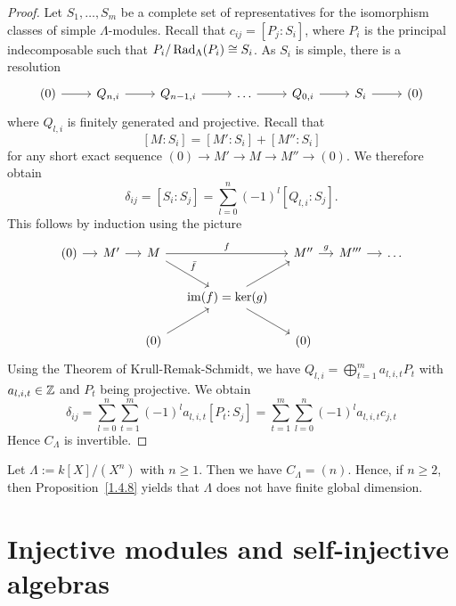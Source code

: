 \begin{proof}
Let $S_1,\dots,S_m$ be a complete set of representatives for the isomorphism classes of simple $\Lambda$-modules. Recall that $c_{ij}=[P_j:S_i]$, where $P_i$ is the principal indecomposable such that $P_i/\operatorname{Rad}_\Lambda(P_i)\cong S_i$. As $S_i$ is simple, there is a resolution
%
\[
\begin{tikzcd}
(0) \rar & Q_{n,i} \rar & Q_{n-1,i} \rar & \dots \rar & Q_{0,i} \rar &  S_i \rar & (0)
\end{tikzcd}
\]
%
where $Q_{l,i}$ is finitely generated and projective. Recall that
\[
[M:S_i] = [M':S_i] + [M'':S_i] 
\]
for any short exact sequence $(0)\to M'\to M\to M''\to (0)$. We therefore obtain
\[
\delta_{ij} = [S_i:S_j] = \sum_{l=0}^n (-1)^l [Q_{l,i}:S_j].
\]
%
This follows by induction using the picture
%
\[
\begin{tikzcd}[column sep=small]
(0) \rar & M' \rar & M \ar[rr,"f"]\ar[dr,"\bar f"]  & & M'' \rar["g"] & M''' \rar & \dots \\
 & & & \im(f) = \ker(g) \ar[ur] \ar[dr] \\
 & & (0) \ar[ur] & & (0)
\end{tikzcd}
\]
%
Using the Theorem of Krull-Remak-Schmidt, we have $Q_{l,i}=\bigoplus_{t=1}^m a_{l,i,t} P_t$ with $a_{l,i,t}\in\mathbb{Z}$ and $P_t$ being projective. We obtain
\[
\delta_{ij}
 = \sum_{l=0}^n \sum_{t=1}^m (-1)^l a_{l,i,t} [P_t:S_j]
 = \sum_{t=1}^m \sum_{l=0}^n (-1)^l a_{l,i,t} c_{j,t}
\]
Hence $C_\Lambda$ is invertible.
\end{proof}


\begin{example}
Let $\Lambda:=k[X]/(X^n)$ with $n\ge 1$. Then we have $C_\Lambda=(n)$. Hence, if $n\ge 2$, then Proposition~\ref{1.4.8} yields that $\Lambda$ does not have finite global dimension.
\end{example}


\section{Injective modules and self-injective algebras}


